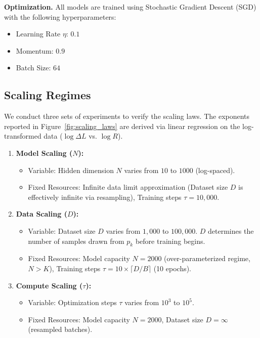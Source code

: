 \documentclass{article}
\theoremstyle{plain}
\theoremstyle{definition}
\theoremstyle{remark}
\begin{document}
\textbf{Optimization.} All models are trained using Stochastic Gradient Descent (SGD) with the following hyperparameters:
\begin{itemize}
    \item Learning Rate $\eta$: $0.1$
    \item Momentum: $0.9$
    \item Batch Size: $64$
\end{itemize}

\subsection{Scaling Regimes}
We conduct three sets of experiments to verify the scaling laws. The exponents reported in Figure~\ref{fig:scaling_laws} are derived via linear regression on the log-transformed data ($\log \Delta L$ vs. $\log R$).

\begin{enumerate}
    \item \textbf{Model Scaling ($N$):}
    \begin{itemize}
        \item Variable: Hidden dimension $N$ varies from $10$ to $1000$ (log-spaced).
        \item Fixed Resources: Infinite data limit approximation (Dataset size $D$ is effectively infinite via resampling), Training steps $\tau = 10,000$.
    \end{itemize}

    \item \textbf{Data Scaling ($D$):}
    \begin{itemize}
        \item Variable: Dataset size $D$ varies from $1,000$ to $100,000$. $D$ determines the number of samples drawn from $p_k$ before training begins.
        \item Fixed Resources: Model capacity $N = 2000$ (over-parameterized regime, $N > K$), Training steps $\tau = 10 \times \lceil D/B \rceil$ (10 epochs).
    \end{itemize}

    \item \textbf{Compute Scaling ($\tau$):}
    \begin{itemize}
        \item Variable: Optimization steps $\tau$ varies from $10^3$ to $10^5$.
        \item Fixed Resources: Model capacity $N = 2000$, Dataset size $D = \infty$ (resampled batches).
    \end{itemize}
\end{enumerate}
\end{document}

